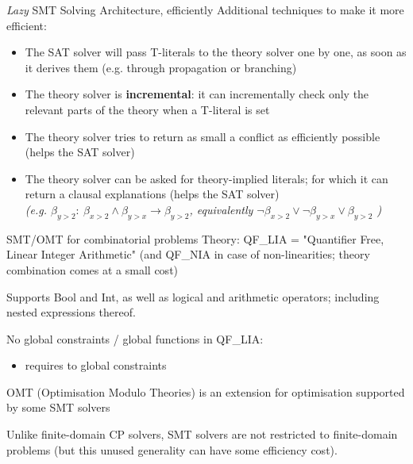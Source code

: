 \documentclass{cons-beamer}
\begin{document}
\begin{frame}{\textit{Lazy} SMT Solving Architecture, efficiently}
	Additional techniques to make it more efficient:
	\begin{itemize}
		\item The SAT solver will pass T-literals to the theory solver one by one, as soon as it derives them (e.g. through propagation or branching)
		\item The theory solver is \textbf{incremental}: it can incrementally check only the relevant parts of the theory when a T-literal is set
		\pause
		\item The theory solver tries to return as small a conflict as efficiently possible (helps the SAT solver)
		\pause
		\item The theory solver can be asked for theory-implied literals; for which it can return a clausal explanations (helps the SAT solver)\\
		\textit{(e.g. $\beta_{y > 2}: ~\beta_{x > 2} \land \beta_{y > x} \rightarrow \beta_{y > 2}$, equivalently $\neg\beta_{x > 2} \lor \neg\beta_{y > x} \lor \beta_{y > 2}$ )}
	\end{itemize}	
\end{frame}


\begin{frame}{SMT/OMT for combinatorial problems}
  Theory: QF\_LIA = "Quantifier Free, Linear Integer Arithmetic"
  (and QF\_NIA in case of non-linearities; theory combination comes at a small cost)
  \vfill

  Supports Bool and Int, as well as logical and arithmetic operators; including nested expressions thereof.
  \vfill
  
  No global constraints / global functions in QF\_LIA:
  \begin{itemize}
  	\item requires to  global constraints
  \end{itemize}
  \vfill
  \pause
  
   OMT (Optimisation Modulo Theories) is an extension for optimisation supported by some SMT solvers
   \vfill
   \pause
   
   Unlike finite-domain CP solvers, SMT solvers are not restricted to finite-domain problems (but this unused generality can have some efficiency cost).
\end{frame}
\end{document}
